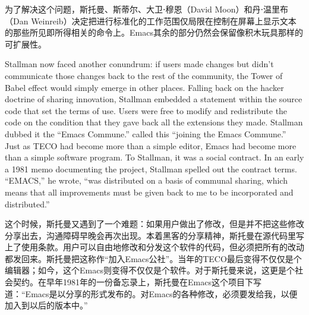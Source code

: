 \ifdefined\chs
为了解决这个问题，斯托曼、斯蒂尔、大卫⋅穆恩（David Moon）和丹⋅温里布（Dan Weinreib）决定把进行标准化的工作范围仅局限在控制在屏幕上显示文本的那些所见即所得相关的命令上。Emacs其余的部分仍然会保留像积木玩具那样的可扩展性。
\fi
\fi

\ifdefined\eng
Stallman now faced another conundrum: if users made changes but didn't communicate those changes back to the rest of the community, the Tower of Babel effect would simply emerge in other places. Falling back on the hacker doctrine of sharing innovation, Stallman embedded a statement within the source code that set the terms of use. Users were free to modify and redistribute the code on the condition that they gave back all the extensions they made. Stallman \ifdefined\vone dubbed it the ``Emacs Commune.'' \fi\ifdefined\vtwo called this ``joining the Emacs Commune.'' \fi Just as TECO had become more than a simple editor, Emacs had become more than a simple software program. To Stallman, it was a social contract. In \ifdefined\vone an early \fi\ifdefined\vtwo a 1981 \fi memo documenting the project, Stallman spelled out the contract terms. ``EMACS,'' he wrote, ``was distributed on a basis of communal sharing, which means that all improvements must be given back to me to be incorporated and distributed.''
\fi

\ifdefined\chs
这个时候，斯托曼又遇到了一个难题：如果用户做出了修改，但是并不把这些修改分享出去，沟通障碍早晚会再次出现。本着黑客的分享精神，斯托曼在源代码里写上了使用条款。用户可以自由地修改和分发这个软件的代码，但必须把所有的改动都发回来。斯托曼把这称作``加入Emacs公社''。当年的TECO最后变得不仅仅是个编辑器；如今，这个Emacs则变得不仅仅是个软件。对于斯托曼来说，这更是个社会契约。在\ifdefined\vone 早年\fi\ifdefined\vtwo 1981年\fi 的一份备忘录上，斯托曼在Emacs这个项目下写道：``Emacs是以分享的形式发布的。对Emacs的各种修改，必须要发给我，以便加入到以后的版本中。''
\fi

